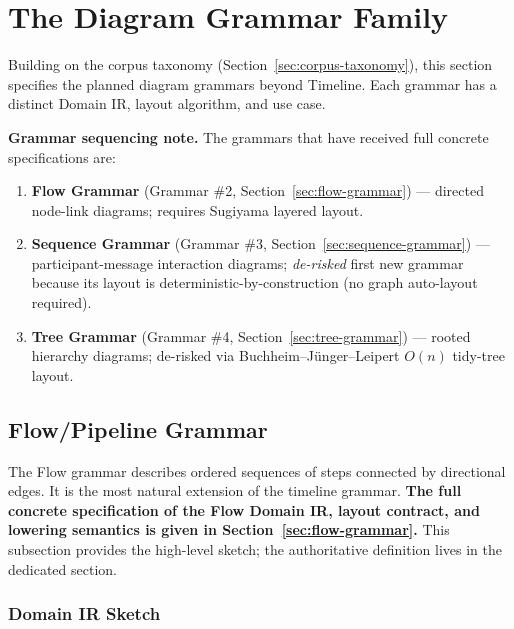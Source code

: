 \section{The Diagram Grammar Family}
\label{sec:diagram-family}

Building on the corpus taxonomy (Section~\ref{sec:corpus-taxonomy}), this section specifies the planned diagram grammars beyond Timeline. Each grammar has a distinct Domain IR, layout algorithm, and use case.

\medskip\noindent
\textbf{Grammar sequencing note.} The grammars that have received full concrete specifications are:
\begin{enumerate}
  \item \textbf{Flow Grammar} (Grammar \#2, Section~\ref{sec:flow-grammar}) --- directed node-link diagrams; requires Sugiyama layered layout.
  \item \textbf{Sequence Grammar} (Grammar \#3, Section~\ref{sec:sequence-grammar}) --- participant-message interaction diagrams; \emph{de-risked} first new grammar because its layout is deterministic-by-construction (no graph auto-layout required).
  \item \textbf{Tree Grammar} (Grammar \#4, Section~\ref{sec:tree-grammar}) --- rooted hierarchy diagrams; de-risked via Buchheim--J{\"u}nger--Leipert $O(n)$ tidy-tree layout.
\end{enumerate}

\subsection{Flow/Pipeline Grammar}
\label{sec:flow-grammar-overview}

The Flow grammar describes ordered sequences of steps connected by directional edges. It is the most natural extension of the timeline grammar. \textbf{The full concrete specification of the Flow Domain IR, layout contract, and lowering semantics is given in Section~\ref{sec:flow-grammar}.} This subsection provides the high-level sketch; the authoritative definition lives in the dedicated section.

\subsubsection{Domain IR Sketch}


